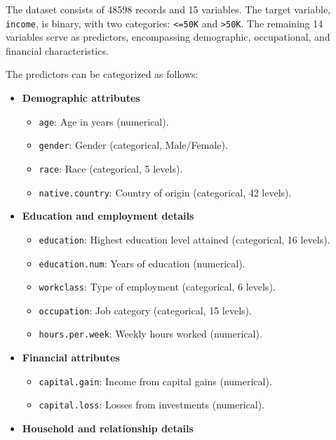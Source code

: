 \documentclass[
]{book}
\newcommand{\passthrough}[1]{#1}
\providecommand{\tightlist}{%
  \setlength{\itemsep}{0pt}\setlength{\parskip}{0pt}}
\theoremstyle{definition}
\theoremstyle{definition}
\theoremstyle{definition}
\theoremstyle{definition}
\theoremstyle{remark}
\begin{document}
The dataset consists of 48598 records and 15 variables. The target variable, \passthrough{\lstinline!income!}, is binary, with two categories: \passthrough{\lstinline!<=50K!} and \passthrough{\lstinline!>50K!}. The remaining 14 variables serve as predictors, encompassing demographic, occupational, and financial characteristics.

The predictors can be categorized as follows:

\begin{itemize}
\tightlist
\item
  \textbf{Demographic attributes}

  \begin{itemize}
  \tightlist
  \item
    \passthrough{\lstinline!age!}: Age in years (numerical).\\
  \item
    \passthrough{\lstinline!gender!}: Gender (categorical, Male/Female).\\
  \item
    \passthrough{\lstinline!race!}: Race (categorical, 5 levels).\\
  \item
    \passthrough{\lstinline!native.country!}: Country of origin (categorical, 42 levels).
  \end{itemize}
\item
  \textbf{Education and employment details}

  \begin{itemize}
  \tightlist
  \item
    \passthrough{\lstinline!education!}: Highest education level attained (categorical, 16 levels).\\
  \item
    \passthrough{\lstinline!education.num!}: Years of education (numerical).\\
  \item
    \passthrough{\lstinline!workclass!}: Type of employment (categorical, 6 levels).\\
  \item
    \passthrough{\lstinline!occupation!}: Job category (categorical, 15 levels).\\
  \item
    \passthrough{\lstinline!hours.per.week!}: Weekly hours worked (numerical).
  \end{itemize}
\item
  \textbf{Financial attributes}

  \begin{itemize}
  \tightlist
  \item
    \passthrough{\lstinline!capital.gain!}: Income from capital gains (numerical).\\
  \item
    \passthrough{\lstinline!capital.loss!}: Losses from investments (numerical).
  \end{itemize}
\item
  \textbf{Household and relationship details}


\end{itemize}
\end{document}
